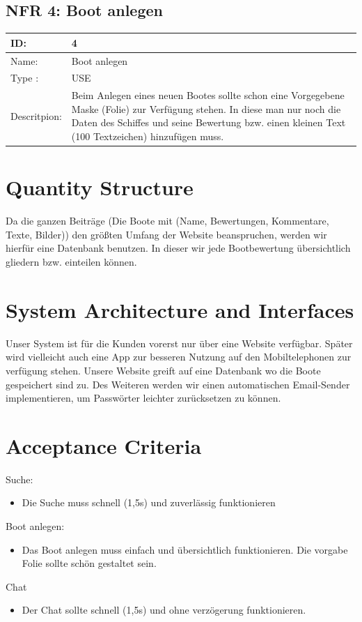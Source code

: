 \documentclass[12pt]{article}
\theoremstyle{definition}
\begin{document}
\subsection{NFR 4: Boot anlegen}
\begin{tabular}{|p{.2\linewidth}|p{.65\linewidth}|}
\hline 
ID: & 4 \\ \hline
Name: & Boot anlegen \\ \hline
Type	: & USE \\ \hline
Descritpion: &  Beim Anlegen eines neuen Bootes sollte schon eine Vorgegebene Maske (Folie) zur Verfügung stehen. In diese man nur noch die Daten des Schiffes und seine Bewertung bzw. einen kleinen Text (100 Textzeichen) hinzufügen muss.\\ \hline
\end{tabular}
\pagebreak

\section{Quantity Structure}
Da die ganzen Beiträge (Die Boote mit (Name, Bewertungen, Kommentare, Texte, Bilder)) den größten Umfang der Website beanspruchen, werden wir hierfür eine Datenbank benutzen. In dieser wir jede Bootbewertung übersichtlich gliedern bzw. einteilen können.

\pagebreak
\section{System Architecture and Interfaces}
Unser System ist für die Kunden vorerst nur über eine Website verfügbar. Später wird vielleicht auch eine App zur besseren Nutzung auf den Mobiltelephonen zur verfügung stehen. Unsere Website greift auf eine Datenbank wo die Boote gespeichert sind zu. Des Weiteren werden wir einen automatischen Email-Sender implementieren, um Passwörter leichter zurücksetzen zu können.

\pagebreak
\section{Acceptance Criteria}
Suche:
\begin{itemize}
	\item Die Suche muss schnell (1,5s) und zuverlässig funktionieren
\end{itemize}
Boot anlegen:
\begin{itemize}
	\item Das Boot anlegen muss einfach und übersichtlich funktionieren. Die vorgabe Folie sollte schön gestaltet sein.
\end{itemize}
Chat
\begin{itemize}
	\item Der Chat sollte schnell (1,5s) und ohne verzögerung funktionieren.
\end{itemize}
\cite{endLine}
{}

\end{document}

